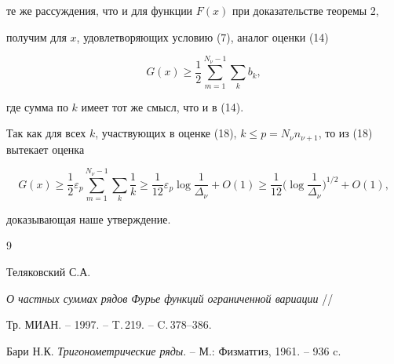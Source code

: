 те же рассуждения, что и для функции $F(x)$ при доказательстве теоремы 2,


получим для $x$, удовлетворяющих условию (7), аналог оценки (14)


\begin{equation}


G(x) \ge \frac{1}{2} \sum_{m = 1}^{N_{\nu} - 1} \sum_k b_k,


\end{equation}


где сумма по $k$ имеет тот же смысл, что и в (14).





Так как для всех $k$, участвующих в оценке (18), $k \le p =


N_{\nu} n_{\nu + 1}$, то из (18) вытекает оценка


$$


G(x) \ge \frac{1}{2} \varepsilon_p \sum_{m = 1}^{N_{\nu} - 1} \sum_k


\frac{1}{k} \ge \frac{1}{12} \varepsilon_p \log \frac{1}{\Delta_{\nu}} + O(1)


\ge \frac{1}{12} \Bigg ( \log \frac{1}{\Delta_{\nu}} \Bigg )^{1 / 2} + O(1),


$$


доказывающая наше утверждение.


\newpage





\begin{thebibliography}{9}







Теляковский С.А.


{\em О частных суммах рядов Фурье функций ограниченной вариации} //


Тр. МИАН. -- 1997. -- T.\,219. -- C.\,378--386.




Бари Н.К. {\em Тригонометрические ряды}. -- М.: Физматгиз, 1961. -- 936 c.





\end{thebibliography}





\vskip 2cm












\label{end}






